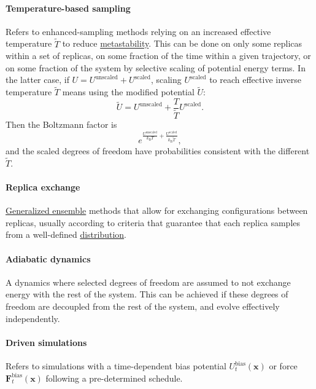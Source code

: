 \documentclass[9pt,review]{livecoms}
\newcommand{\vx}{\mathbf{x}}
\newcommand{\vF}{\mathbf{F}}
\begin{document}
\paragraph{Temperature-based sampling} Refers to enhanced-sampling methods relying on an increased effective temperature $\tilde T$ to reduce \hyperlink{ref:metastab} {metastability}. This can be done on only some replicas within a set of replicas, on some fraction of the time within a given trajectory, or on some fraction of the system by selective scaling of potential energy terms.
In the latter case, if $U = U^\mathrm{unscaled} + U^\mathrm{scaled}$, scaling $U^\mathrm{scaled}$ to reach effective inverse temperature $\tilde T$ means using the modified potential $\tilde U$:
\begin{equation}
\tilde U = U^\mathrm{unscaled} + \frac{T}{\tilde T} U^\mathrm{scaled}.
\end{equation}
Then the Boltzmann factor is
\begin{equation}
e^{\frac{U^\mathrm{unscaled}}{k_\mathrm{B}T} + \frac{U^{\mathrm{scaled}}}{k_\mathrm{B} \tilde T}},
\end{equation}
and the scaled degrees of freedom have probabilities consistent with the different $\tilde T$.

\hypertarget{ref:ReplEx} {\paragraph{Replica exchange}} \hyperlink{ref:GenEns} {Generalized ensemble} methods that allow for exchanging configurations between replicas, usually according to criteria that guarantee that each replica samples from a well-defined \hyperlink{ref:Distribution} {distribution}.

\hypertarget{ref:AdiabaticDyn} {\paragraph{Adiabatic dynamics}}
A dynamics where selected degrees of freedom are assumed to not exchange energy with the rest of the system.
This can be achieved if these degrees of freedom are decoupled from the rest of the system, and evolve effectively independently.

\hypertarget{ref:Driven} {\paragraph{Driven simulations}} Refers to simulations with a time-dependent bias potential $U^{\mathrm{bias}}_t(\vx)$ or force $\vF^\mathrm{bias}_t(\vx)$ following a pre-determined schedule.
\end{document}
